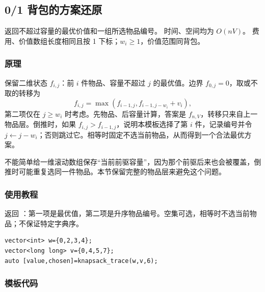 \subsection{0/1 背包的方案还原}
\label{dp:knapsack-trace}
\AlgorithmInfo
    {返回不超过容量的最优价值和一组所选物品编号。}
    {时间、空间均为 $O(nV)$。}
    {费用、价值数组长度相同且按 1 下标；$w_i\ge1$，价值范围同背包。}
\subsubsection*{原理}

保留二维状态 $f_{i,j}$：前 $i$ 件物品、容量不超过 $j$ 的最优值。边界 $f_{0,j}=0$，取或不取的转移为
\[
 f_{i,j}=\max(f_{i-1,j},f_{i-1,j-w_i}+v_i),
\]
第二项仅在 $j\ge w_i$ 时考虑。先物品、后容量计算，答案是 $f_{n,V}$，转移只来自上一物品层。倒推时，如果 $f_{i,j}>f_{i-1,j}$，说明本模板选择了第 $i$ 件，记录编号并令 $j\gets j-w_i$；否则跳过它。相等时固定不选当前物品，从而得到一个合法最优方案。

不能简单给一维滚动数组保存“当前前驱容量”，因为那个前驱后来也会被覆盖，倒推时可能重复选同一件物品。本节保留完整的物品层来避免这个问题。

\subsubsection*{使用教程}
 返回 ：第一项是最优值，第二项是升序物品编号。空集可选，相等时不选当前物品；不保证特定字典序。
\begin{lstlisting}[style=mtycpp,numbers=none]
vector<int> w={0,2,3,4};
vector<long long> v={0,4,5,7};
auto [value,chosen]=knapsack_trace(w,v,6);
\end{lstlisting}
\subsubsection*{模板代码}
